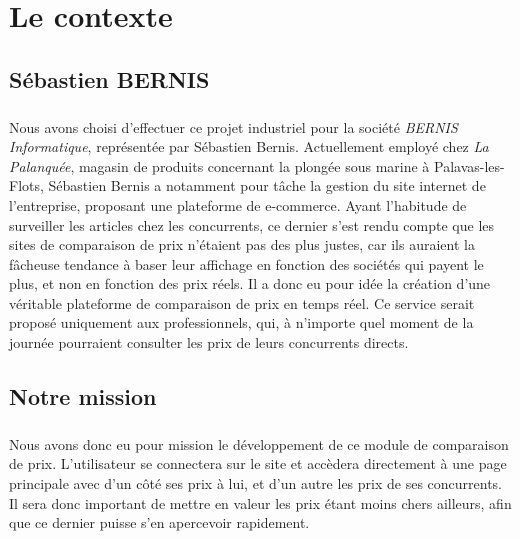 \documentclass{report}
\begin{document}
\chapter{Le contexte}

\section{Sébastien BERNIS}

\paragraph{}

Nous avons choisi d'effectuer ce projet industriel pour la société \textit{BERNIS Informatique}, représentée par Sébastien Bernis.
Actuellement employé chez \textit{La Palanquée}, magasin de produits concernant la plongée sous marine à Palavas-les-Flots, Sébastien Bernis a notamment pour tâche la gestion du site internet de l'entreprise, proposant une plateforme de e-commerce.
\newline
Ayant l'habitude de surveiller les articles chez les concurrents, ce dernier s'est rendu compte que les sites de comparaison de prix n'étaient pas des plus justes, car ils auraient la fâcheuse tendance à baser leur affichage en fonction des sociétés qui payent le plus, et non en fonction des prix réels. Il a donc eu pour idée la création d'une véritable plateforme de comparaison de prix en temps réel. Ce service serait proposé uniquement aux professionnels, qui, à n'importe quel moment de la journée pourraient consulter les prix de leurs concurrents directs.



\section{Notre mission}

\paragraph{}

Nous avons donc eu pour mission le développement de ce module de comparaison de prix. L'utilisateur se connectera sur le site et accèdera directement à une page principale avec d'un côté ses prix à lui, et d'un autre les prix de ses concurrents. Il sera donc important de mettre en valeur les prix étant moins chers ailleurs, afin que ce dernier puisse s'en apercevoir rapidement.
\end{document}
